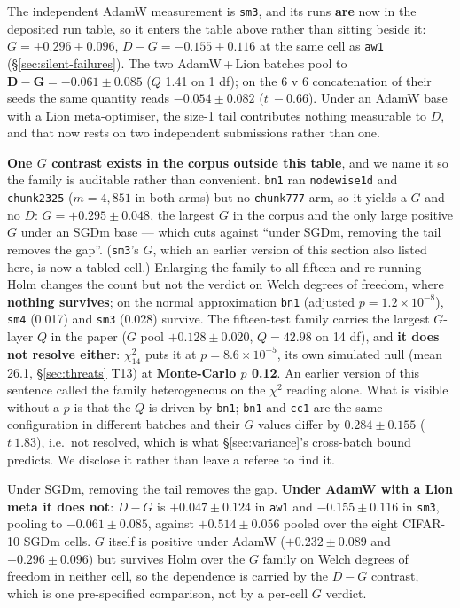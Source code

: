\documentclass[10pt,letterpaper]{article}
\newcommand{\Dstat}{D}                         %
\newcommand{\Gstat}{G}                         %
\newcommand{\arm}[1]{\texttt{#1}}
\begin{document}
The independent AdamW measurement is \arm{sm3}, and its runs \textbf{are} now in the deposited run
table, so it enters the table above rather than sitting beside it: $\Gstat = +0.296 \pm 0.096$,
$\Dstat - \Gstat = -0.155 \pm 0.116$
at the same cell as \arm{aw1} (\S\ref{sec:silent-failures}). The two AdamW\,+\,Lion batches pool
to $\mathbf{\Dstat - \Gstat = -0.061 \pm 0.085}$ ($Q$ 1.41 on 1 df); on the 6 v 6 concatenation of
their seeds the same quantity reads $-0.054 \pm 0.082$ ($t\ -0.66$). Under an AdamW base with a
Lion meta-optimiser, the size-1 tail contributes nothing measurable to $\Dstat$, and that now
rests on two independent submissions rather than one.

\textbf{One $\Gstat$ contrast exists in the corpus outside this table}, and we name it so the
family is auditable rather than convenient. \arm{bn1} ran \arm{nodewise1d} and \arm{chunk2325}
($m = 4{,}851$ in both arms) but no \arm{chunk777} arm, so it yields a $\Gstat$ and no $\Dstat$:
$\Gstat = +0.295 \pm 0.048$, the largest $\Gstat$ in the corpus and the only large positive
$\Gstat$ under an SGDm base --- which cuts against ``under SGDm, removing the tail removes the
gap''. (\arm{sm3}'s $\Gstat$, which an earlier version of this section also listed here, is now a
tabled cell.) Enlarging the family to all fifteen and
re-running Holm changes the count but not the verdict on Welch degrees
of freedom, where \textbf{nothing survives}; on the normal approximation
\arm{bn1} (adjusted $p = 1.2\times10^{-8}$), \arm{sm4} (0.017) and \arm{sm3} (0.028) survive.
The fifteen-test family carries the largest $\Gstat$-layer $Q$ in the paper ($\Gstat$ pool
$+0.128 \pm 0.020$, $Q = 42.98$ on 14 df), and \textbf{it does not resolve either}: $\chi^2_{14}$
puts it at $p = 8.6\times10^{-5}$, its own simulated null (mean 26.1, \S\ref{sec:threats} T13)
at \textbf{Monte-Carlo $p$ 0.12}. An earlier version of this sentence called the family
heterogeneous on the $\chi^2$ reading alone. What is visible without a $p$ is that the $Q$ is
driven
by \arm{bn1}; \arm{bn1} and \arm{cc1} are the same configuration in different batches and their
$\Gstat$ values differ by $0.284 \pm 0.155$ ($t\ 1.83$), i.e.\ not resolved, which is what
\S\ref{sec:variance}'s cross-batch bound predicts. We disclose it rather than leave a referee to
find it.

Under SGDm, removing the tail removes the gap. \textbf{Under AdamW with a Lion meta it does not}:
$\Dstat - \Gstat$ is $+0.047 \pm 0.124$ in \arm{aw1} and $-0.155 \pm 0.116$ in \arm{sm3}, pooling
to $-0.061 \pm 0.085$, against $+0.514 \pm 0.056$ pooled
over the eight CIFAR-10 SGDm cells. $\Gstat$ itself is positive under AdamW
($+0.232 \pm 0.089$ and $+0.296 \pm 0.096$) but survives Holm over the $\Gstat$ family on Welch
degrees of freedom in neither cell, so the
dependence is carried by the $\Dstat - \Gstat$ contrast, which is one pre-specified
comparison, not by a per-cell $\Gstat$ verdict.
\end{document}
